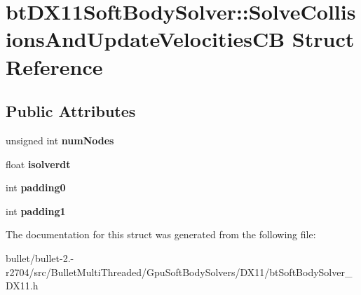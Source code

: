 \hypertarget{structbt_d_x11_soft_body_solver_1_1_solve_collisions_and_update_velocities_c_b}{\section{bt\+D\+X11\+Soft\+Body\+Solver\+:\+:Solve\+Collisions\+And\+Update\+Velocities\+C\+B Struct Reference}
\label{structbt_d_x11_soft_body_solver_1_1_solve_collisions_and_update_velocities_c_b}
}
\subsection*{Public Attributes}
\begin{DoxyCompactItemize}
\item 
\hypertarget{structbt_d_x11_soft_body_solver_1_1_solve_collisions_and_update_velocities_c_b_a9f5cdac77c71cbe818b0966667e0a567}{unsigned int {\bfseries num\+Nodes}}\label{structbt_d_x11_soft_body_solver_1_1_solve_collisions_and_update_velocities_c_b_a9f5cdac77c71cbe818b0966667e0a567}

\item 
\hypertarget{structbt_d_x11_soft_body_solver_1_1_solve_collisions_and_update_velocities_c_b_abc75bf04f4ae4df1846cc6e3bf318d8b}{float {\bfseries isolverdt}}\label{structbt_d_x11_soft_body_solver_1_1_solve_collisions_and_update_velocities_c_b_abc75bf04f4ae4df1846cc6e3bf318d8b}

\item 
\hypertarget{structbt_d_x11_soft_body_solver_1_1_solve_collisions_and_update_velocities_c_b_aad340c9796c6941a15235a9466f2a365}{int {\bfseries padding0}}\label{structbt_d_x11_soft_body_solver_1_1_solve_collisions_and_update_velocities_c_b_aad340c9796c6941a15235a9466f2a365}

\item 
\hypertarget{structbt_d_x11_soft_body_solver_1_1_solve_collisions_and_update_velocities_c_b_a55af3d04e9baeb10ff1748eea6449378}{int {\bfseries padding1}}\label{structbt_d_x11_soft_body_solver_1_1_solve_collisions_and_update_velocities_c_b_a55af3d04e9baeb10ff1748eea6449378}

\end{DoxyCompactItemize}


The documentation for this struct was generated from the following file\+:\begin{DoxyCompactItemize}
\item 
bullet/bullet-\/2.-\/r2704/src/\+Bullet\+Multi\+Threaded/\+Gpu\+Soft\+Body\+Solvers/\+D\+X11/bt\+Soft\+Body\+Solver\+\_\+\+D\+X11.\+h\end{DoxyCompactItemize}
